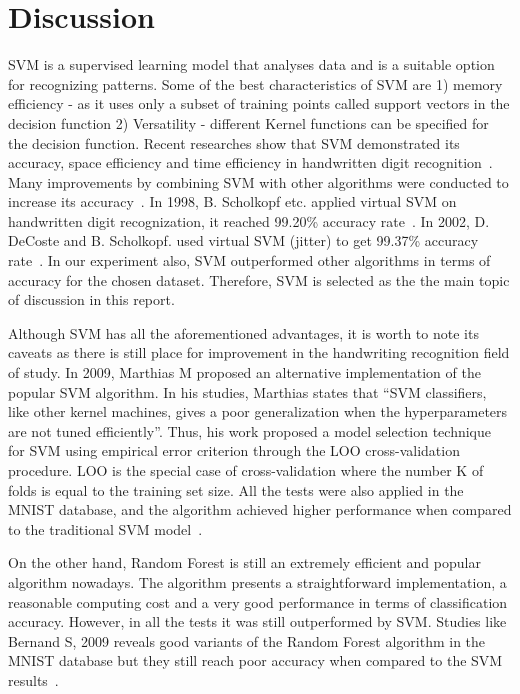 \documentclass[letterpaper,10pt]{article}
\theoremstyle{mytheor}
\begin{document}
\section{Discussion}

SVM is a supervised learning model that analyses data and is a suitable option for recognizing patterns. Some of the best characteristics of SVM are 1) memory efficiency - as it uses only a subset of training points called support vectors  in the decision function 2) Versatility - different Kernel functions can be specified for the decision function. Recent researches show that SVM demonstrated its accuracy, space efficiency and time efficiency in handwritten digit recognition~\cite{kouropteva2003classification}. Many improvements by combining SVM with other algorithms  were conducted to increase its accuracy~\cite{keysers2007comparison}. In 1998, B. Scholkopf etc. applied virtual SVM on handwritten digit recognization, it reached 99.20\% accuracy rate~\cite{scholkopf1998prior}. In 2002, D. DeCoste and B. Scholkopf. used virtual SVM (jitter) to get 99.37\% accuracy rate~\cite{decoste2002training}. In our experiment also, SVM outperformed other algorithms in terms of accuracy for the chosen dataset. Therefore, SVM is selected as the  the main topic of discussion in this report.

Although SVM has all the aforementioned advantages, it is worth to note its caveats as there is still place for improvement in the handwriting recognition field of study. In 2009, Marthias M proposed an alternative implementation of the popular SVM algorithm. In his studies, Marthias states that “SVM classifiers, like other kernel machines, gives a poor generalization when the hyperparameters are not tuned efficiently”. Thus, his work proposed a model selection technique for SVM using empirical error criterion through the LOO cross-validation procedure. LOO is the special case of cross-validation where the number K of folds is equal to the training set size. All the tests were also applied in the MNIST database, and the algorithm achieved higher performance when compared to the traditional SVM model~\cite{adankon2009model}.

On the other hand, Random Forest is still an extremely efficient and popular algorithm nowadays. The algorithm presents a straightforward implementation, a reasonable computing cost and a very good performance in terms of classification accuracy. However, in all the tests it was still outperformed by SVM. Studies like Bernand S, 2009 reveals good variants of the Random Forest algorithm in the MNIST database but they still reach poor accuracy when compared to the SVM results~\cite{bernard2007using}.
\end{document}
